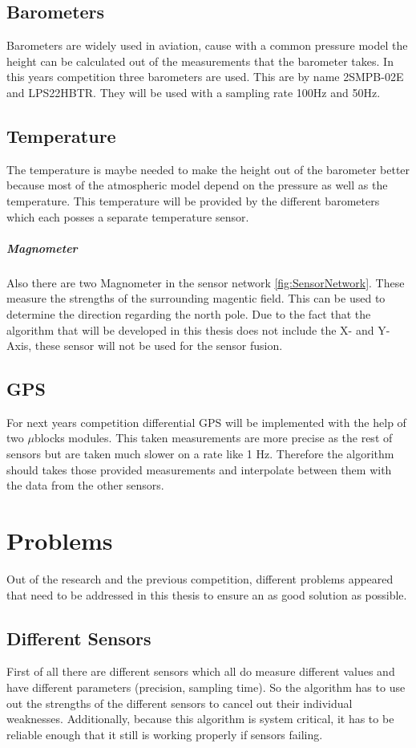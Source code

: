  \subsection{Barometers}
 Barometers are widely used in aviation, cause with a common pressure model the height can be calculated out of the measurements that the barometer takes.
 In this years competition three barometers are used. This are by name 2SMPB-02E and LPS22HBTR. They will be used with a sampling rate 100Hz and 50Hz. %
 
 \subsection{Temperature}
 The temperature is maybe needed to make the height out of the barometer better because most of the atmospheric model depend on the pressure as well as the temperature.
 This temperature will be provided by the different barometers which each posses a separate temperature sensor. 
 
 \subparagraph{Magnometer}
 Also there are two Magnometer in the sensor network \ref{fig:SensorNetwork}. These measure the strengths of the surrounding magentic field.
 This can be used to determine the direction regarding the north pole.
 Due to the fact that the algorithm that will be developed in this thesis does not include the X- and Y-Axis,
 these sensor will not be used for the sensor fusion.
 
 \subsection{GPS}
 For next years competition differential GPS will be implemented with the help of two $\mu$blocks modules.
 This taken measurements are more precise as the rest of sensors but are taken much slower on a rate like 1 Hz. Therefore the algorithm should takes
 those provided measurements and interpolate between them with the data from the other sensors.
 
 
 \section{Problems}
 Out of the research and the previous competition, different problems appeared that need to be addressed in this thesis to ensure an as good solution as possible.
 
 \subsection{Different Sensors}
 First of all there are different sensors which all do measure different values and have different parameters (precision, sampling time).
 So the algorithm has to use out the strengths of the different sensors to cancel out their individual weaknesses.
 Additionally, because this algorithm is system critical, it has to be reliable enough that it still is working properly if sensors failing. 
 
